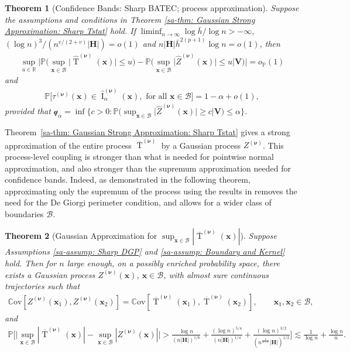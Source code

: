 \documentclass[10pt]{article}
\newtheorem{thm}{Theorem}
\DeclareMathOperator{\Tstat}{T}
\DeclareMathOperator{\CI}{I}
\renewcommand{\P}{\mathbb{P}}
\newcommand{\Cov}{\mathbb{C}\mathrm{ov}}
\newcommand{\reals}{\mathbb{R}}
\newcommand{\bH}{\mathbf{H}}
\newcommand{\bV}{\mathbf{V}}
\newcommand{\bx}{\mathbf{x}}
\newcommand{\bnu}{\boldsymbol{\nu}}
\newcommand{\B}{\mathcal{B}}
\newcommand{\q}{\mathcal{q}}
\begin{document}
\begin{thm}[Confidence Bands: Sharp BATEC; process approximation]\label{sa-thm: Confidence Bands: Sharp BATEC -- process}
    Suppose the assumptions and conditions in Theorem \ref{sa-thm: Gaussian Strong Approximation: Sharp Tstat} hold. If $\liminf_{n \to \infty} \log \bar{h}/\log n > - \infty$, $(\log n)^{3}/(n^{v/(2+v)}|\bH|) = o(1)$ and $n |\bH| \bar{h}^{2(p+1)}\log n = o(1)$, then
    \begin{align*}
        \sup_{u \in \reals} \Big|\P \Big(\sup_{\bx \in \B} \big|\widehat{\Tstat}^{(\bnu)}(\bx)\big| \leq u \Big)
                            - \P \Big(\sup_{\bx \in \B} \big|\widehat{Z}^{(\bnu)}(\bx)\big| \leq u \Big| \bV \Big) \Big| = o_{\P}(1)
    \end{align*}
    and
    \begin{align*}
        \P\Big[\tau^{(\bnu)}(\bx) \in \widehat{\CI}_{\alpha}^{(\bnu)}(\bx), \text{ for all } \bx \in \B \Big] = 1 - \alpha + o(1),
    \end{align*}
    provided that $\q_{\alpha} = \inf \big\{c > 0: \P \big(\sup_{\bx \in \B} \big|\widehat{Z}^{(\bnu)}(\bx)\big|\geq c \big| \bV \big) \leq \alpha \big\}$.
\end{thm}

Theorem~\ref{sa-thm: Gaussian Strong Approximation: Sharp Tstat} gives a strong approximation of the entire process $\overline{\Tstat}^{(\bnu)}$ by a Gaussian process $Z^{(\bnu)}$. This process-level coupling is stronger than what is needed for pointwise normal approximation, and also stronger than the supremum approximation needed for confidence bands. Indeed, as demonstrated in the following theorem, approximating only the supremum of the process using the results in \cite{Chernozhukov-Chetverikov-Kato_2014b_AoS} removes the need for the De Giorgi perimeter condition, and allows for a wider class of boundaries $\B$.

\begin{thm}[Gaussian Approximation for $\sup_{\bx \in \B} |\overline{\Tstat}^{(\bnu)}(\bx)|$]\label{sa-thm: Gaussian Approximation Suprema -- Sharp}
Suppose Assumptions \ref{sa-assump: Sharp DGP} and \ref{sa-assump: Boundary and Kernel} hold. Then for $n$ large enough, on a possibly enriched probability space, there exists a Gaussian process $Z^{(\bnu)}(\bx)$, $\bx \in \B$, with almost sure continuous trajectories such that
\begin{align*}
    \Cov[Z^{(\bnu)}(\bx_1), Z^{(\bnu)}(\bx_2)]
    =
    \Cov[\overline{\Tstat}^{(\bnu)}(\bx_1), \overline{\Tstat}^{(\bnu)}(\bx_2)],
    \qquad \bx_1,\bx_2\in\B,
\end{align*}
and
\begin{align*}
    \P\Big[ \big|\sup_{\bx \in \B} |\overline{\Tstat}^{(\bnu)}(\bx)| - \sup_{\bx \in \B} |Z^{(\bnu)}(\bx)|\big| > \frac{\log n}{(n |\bH|)^{1/6}} + \frac{(\log n)^{5/4}}{(n |\bH|)^{1/4}} + \frac{(\log n)^{3/2}}{(n^{\frac{v}{2+v}} |\bH|)^{1/2}}\Big] \lesssim \frac{1}{\log n} + \frac{\log n}{n}.
\end{align*}
\end{thm}
\end{document}
